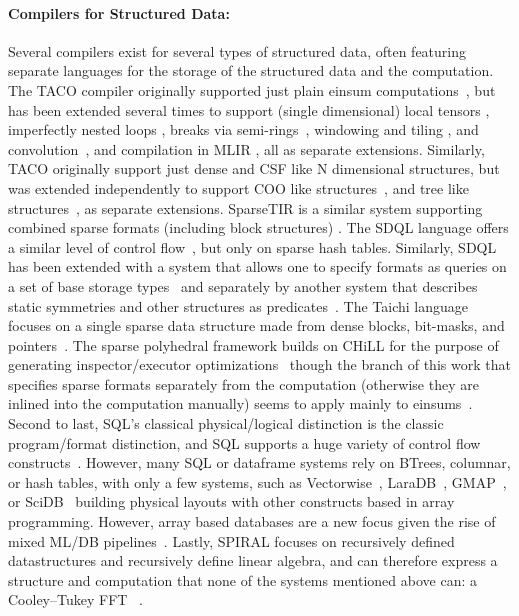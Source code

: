 \paragraph{ Compilers for Structured Data:}
Several compilers exist for several types of structured data, often featuring separate languages for the storage of the structured data and the computation.
%
The TACO compiler originally supported just plain einsum computations~\cite{kjolstad_tensor_2017}, but has been extended several times to support (single dimensional) local tensors \cite{kjolstad_tensor_2019}, imperfectly nested loops \cite{dias_sparselnr_2022}, breaks via semi-rings~\cite{henry_compilation_2021}, windowing and tiling \cite{senanayake2020sparse}, and convolution~\cite{won2023unified}, and compilation in MLIR \cite{bik_compiler_2022}, all as separate extensions.
%
Similarly, TACO originally support just dense and CSF like N dimensional structures, but was extended independently to support COO like structures~\cite{chou2018format}, and tree like structures~\cite{chou2022compilation}, as separate extensions. SparseTIR is a similar system supporting combined 
sparse formats (including block structures) \cite{ye_sparsetir_2022}.
%
The SDQL language offers a similar level of control flow~\cite{shaikhha2022functional}, but only on sparse hash tables.
%
Similarly, SDQL has been extended with a system that allows one to specify formats as queries on a set of base storage types~\cite{schleich2023optimizing} and separately by another system that describes static symmetries and other structures as predicates~\cite{ghorbani2023compiling}.
%
The Taichi language focuses on a single sparse data structure made from dense blocks, bit-masks, and pointers~\cite{hu_taichi_2019}.
%
%
The sparse polyhedral framework builds on CHiLL for the purpose of generating inspector/executor optimizations~\cite{strout2018sparse} though the branch of this work that specifies sparse formats separately from the computation (otherwise they are inlined into the computation manually) seems to apply mainly to einsums~\cite{zhao2022polyhedral}.
%
Second to last, SQL's classical physical/logical distinction is the classic program/format distinction, and SQL supports a huge variety of control flow constructs~\cite{kotlyar1997relational, date1989guide}.
%
However, many SQL or dataframe systems rely on BTrees, columnar, or hash tables, with only a few systems, such as Vectorwise~\cite{boncz2012vectorwise}, LaraDB~\cite{hutchison2017laradb}, GMAP~\cite{tsatalos1996gmap}, or SciDB~\cite{stonebraker2013scidb} building physical layouts with other constructs based in array programming.
%
However, array based databases are a new focus given the rise of mixed ML/DB pipelines~\cite{baumann2021array,luo2018scalable}.
%
Lastly, SPIRAL focuses on recursively defined datastructures and recursively define linear algebra, and can therefore express a structure and computation that none of the systems mentioned above can: a Cooley–Tukey FFT ~\cite{franchetti2018spiral,franchetti2009operator}.
%

